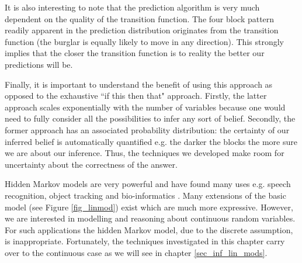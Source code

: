 It is also interesting to note that the prediction algorithm is very much dependent on the quality of the transition function. The four block pattern readily apparent in the prediction distribution originates from the transition function (the burglar is equally likely to move in any direction). This strongly implies that the closer the transition function is to reality the better our predictions will be.

Finally, it is important to understand the benefit of using this approach as opposed to the exhaustive ``if this then that" approach. Firstly, the latter approach scales exponentially with the number of variables because one would need to fully consider all the possibilities to infer any sort of belief. Secondly, the former approach has an associated probability distribution: the certainty of our inferred belief is automatically quantified e.g. the darker the blocks the more sure we are about our inference. Thus, the techniques we developed make room for uncertainty about the correctness of the answer.

Hidden Markov models are very powerful and have found many uses e.g. speech recognition, object tracking and bio-informatics \cite{barber}. Many extensions of the basic model (see Figure \ref{fig_linmod}) exist which are much more expressive. However, we are interested in modelling and reasoning about continuous random variables. For such applications the hidden Markov model, due to the discrete assumption, is inappropriate. Fortunately, the techniques investigated in this chapter carry over to the continuous case as we will see in chapter \ref{sec_inf_lin_mods}.  

